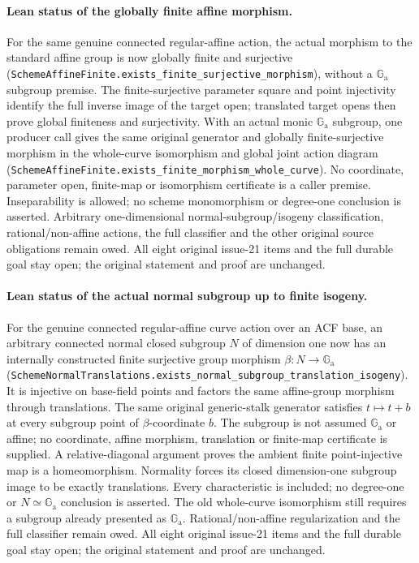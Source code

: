 \documentclass[11pt,oneside]{article}
\theoremstyle{definition}
\theoremstyle{remark}
\newcommand{\Ga}{\mathbb G_{\mathrm a}}
\newcommand{\lean}[1]{\nolinkurl{#1}}
\begin{document}
\paragraph{Lean status of the globally finite affine morphism.}
For the same genuine connected regular-affine action, the actual morphism to the standard
affine group is now globally finite and surjective
(\lean{SchemeAffineFinite.exists_finite_surjective_morphism}), without a $\Ga$ subgroup
premise. The finite-surjective parameter square and point injectivity identify the full
inverse image of the target open; translated target opens then prove global finiteness
and surjectivity. With an actual monic $\Ga$ subgroup, one producer call gives the same
original generator and globally finite-surjective morphism in the whole-curve isomorphism
and global joint action diagram (\lean{SchemeAffineFinite.exists_finite_morphism_whole_curve}).
No coordinate, parameter open, finite-map or isomorphism certificate is a caller premise.
Inseparability is allowed; no scheme monomorphism or degree-one conclusion is asserted.
Arbitrary one-dimensional normal-subgroup/isogeny classification, rational/non-affine
actions, the full classifier and the other original source obligations remain owed.
All eight original issue-21 items and the full durable goal stay open; the original
statement and proof are unchanged.

\paragraph{Lean status of the actual normal subgroup up to finite isogeny.}
For the genuine connected regular-affine curve action over an ACF base, an arbitrary
connected normal closed subgroup $N$ of dimension one now has an internally constructed
finite surjective group morphism $\beta:N\to\Ga$
(\lean{SchemeNormalTranslations.exists_normal_subgroup_translation_isogeny}). It is
injective on base-field points and factors the same affine-group morphism through
translations. The same original generic-stalk generator satisfies $t\mapsto t+b$ at every
subgroup point of $\beta$-coordinate $b$. The subgroup is not assumed $\Ga$ or affine;
no coordinate, affine morphism, translation or finite-map certificate is supplied.
A relative-diagonal argument proves the ambient finite point-injective map is a
homeomorphism. Normality forces its closed dimension-one subgroup image to be exactly
translations. Every characteristic is included; no degree-one or $N\simeq\Ga$ conclusion
is asserted. The old whole-curve isomorphism still requires a subgroup already presented
as $\Ga$. Rational/non-affine regularization and the full classifier remain owed.
All eight original issue-21 items and the full durable goal stay open; the original
statement and proof are unchanged.
\end{document}
